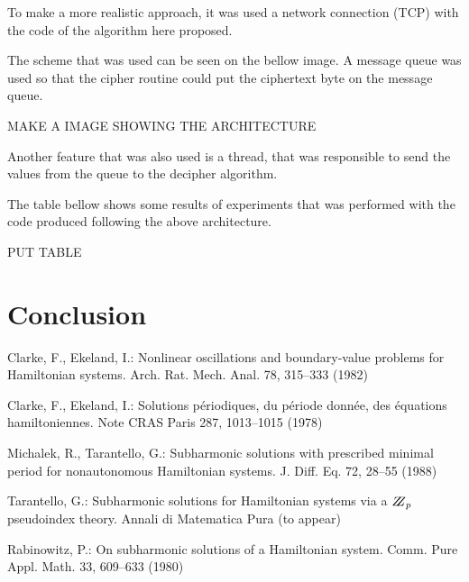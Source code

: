 \documentclass{llncs}
\begin{document}
To make a more realistic approach, it was used a network connection (TCP) with the code of the algorithm here proposed. 

The scheme that was used can be seen on the bellow image. A message queue was used so that the cipher routine could put the ciphertext byte on the message queue.

MAKE A IMAGE SHOWING THE ARCHITECTURE

Another feature that was also used is a  thread, that was responsible to send the values from the queue to the decipher algorithm. 

The table bellow shows some results of experiments that was performed with the code produced following the above architecture.

PUT TABLE


\section{Conclusion}



%
%
\begin{thebibliography}{5}
%
Clarke, F., Ekeland, I.:
Nonlinear oscillations and
boundary-value problems for Hamiltonian systems.
Arch. Rat. Mech. Anal. 78, 315--333 (1982)

Clarke, F., Ekeland, I.:
Solutions p\'{e}riodiques, du
p\'{e}riode donn\'{e}e, des \'{e}quations hamiltoniennes.
Note CRAS Paris 287, 1013--1015 (1978)

Michalek, R., Tarantello, G.:
Subharmonic solutions with prescribed minimal
period for nonautonomous Hamiltonian systems.
J. Diff. Eq. 72, 28--55 (1988)

Tarantello, G.:
Subharmonic solutions for Hamiltonian
systems via a $\bbbz_{p}$ pseudoindex theory.
Annali di Matematica Pura (to appear)

Rabinowitz, P.:
On subharmonic solutions of a Hamiltonian system.
Comm. Pure Appl. Math. 33, 609--633 (1980)

\end{thebibliography}
\end{document}
